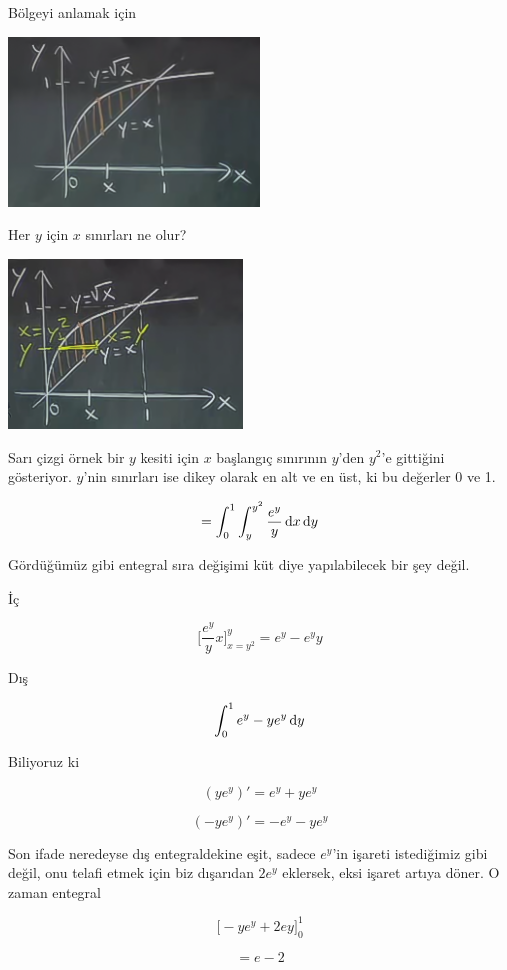 \documentclass[12pt,fleqn]{article}\usepackage{../../common}
\begin{document}
Bölgeyi anlamak için

\includegraphics[height=4.5cm]{16_14.png}

Her $y$ için $x$ sınırları ne olur? 

\includegraphics[height=4.5cm]{16_15.png}

Sarı çizgi örnek bir $y$ kesiti için $x$ başlangıç sınırının $y$'den
$y^2$'e gittiğini gösteriyor. $y$'nin sınırları ise dikey olarak en alt ve
en üst, ki bu değerler 0 ve 1. 

$$ = \int_0^1 \int_y^{y^2}  \frac{e^y}{y} \,\mathrm{d} x \,\mathrm{d} y $$

Gördüğümüz gibi entegral sıra değişimi küt diye yapılabilecek bir şey
değil. 

İç

$$
\bigg[ \frac{e^y}{y}x \bigg]_{x=y^2}^{y} =  e^y - e^yy
$$

Dış

$$ \int_0^1 e^y - ye^y \,\mathrm{d} y  $$

Biliyoruz ki 

$$ (ye^y)' = e^y + ye^y $$

$$ (-ye^y)' = -e^y - ye^y $$

Son ifade neredeyse dış entegraldekine eşit, sadece $e^y$'in işareti
istediğimiz gibi değil, onu telafi etmek için biz dışarıdan $2e^y$
eklersek, eksi işaret artıya döner. O zaman entegral 

$$ \bigg[ -ye^y + 2ey \bigg]_0^1 $$

$$ = e - 2 $$
\end{document}

